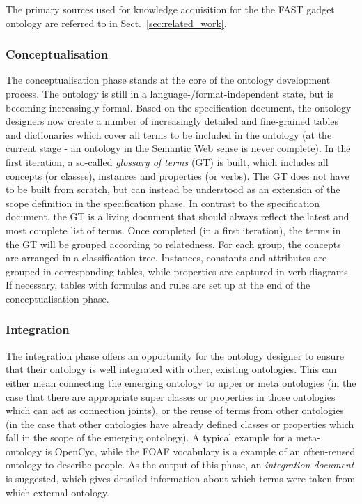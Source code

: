 \documentclass{fast_latex}
\begin{document}
The primary sources used for knowledge acquisition for the the FAST gadget ontology are referred to in Sect.~\ref{sec:related_work}.

\subsubsection{Conceptualisation} %
\label{ssub:conceptualisation}

The conceptualisation phase stands at the core of the ontology development process. The ontology is still in a language-/format-independent state, but is becoming increasingly formal. Based on the specification document, the ontology designers now create a number of increasingly detailed and fine-grained tables and dictionaries which cover all terms to be included in the ontology (at the current stage - an ontology in the Semantic Web sense is never complete). In the first iteration, a so-called \emph{glossary of terms} (GT) is built, which includes all concepts (or classes), instances and properties (or verbs). The GT does not have to be built from scratch, but can instead be understood as an extension of the scope definition in the specification phase.  In contrast to the specification document, the GT is a living document that should always reflect the latest and most complete list of terms. Once completed (in a first iteration), the terms in the GT will be grouped according to relatedness. For each group, the concepts are arranged in a classification tree. Instances, constants and attributes are grouped in corresponding tables, while properties are captured in verb diagrams. If necessary, tables with formulas and rules are set up at the end of the conceptualisation phase.

\subsubsection{Integration} %
\label{ssub:integration}

The integration phase offers an opportunity for the ontology designer to ensure that their ontology is well integrated with other, existing ontologies. This can either mean connecting the emerging ontology to upper or meta ontologies (in the case that there are appropriate super classes or properties in those ontologies which can act as connection joints), or the reuse of terms from other ontologies (in the case that other ontologies have already defined classes or properties which fall in the scope of the emerging ontology). A typical example for a meta-ontology is OpenCyc, while the FOAF vocabulary \cite{brickley2004foaf} is a example of an often-reused ontology to describe people. As the output of this phase, an \emph{integration document} is suggested, which gives detailed information about which terms were taken from which external ontology.
\end{document}
